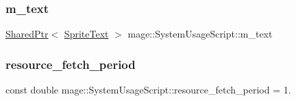 \subsubsection{\texorpdfstring{m\+\_\+text}{m\_text}}
{\footnotesize\ttfamily \hyperlink{namespacemage_a1e01ae66713838a7a67d30e44c67703e}{Shared\+Ptr}$<$ \hyperlink{classmage_1_1_sprite_text}{Sprite\+Text} $>$ mage\+::\+System\+Usage\+Script\+::m\+\_\+text\hspace{0.3cm}{\ttfamily [private]}}

\hypertarget{classmage_1_1_system_usage_script_a98a30b1da6b9b87237e3509aed961162}{}\label{classmage_1_1_system_usage_script_a98a30b1da6b9b87237e3509aed961162} 
\subsubsection{\texorpdfstring{resource\+\_\+fetch\+\_\+period}{resource\_fetch\_period}}
{\footnotesize\ttfamily const double mage\+::\+System\+Usage\+Script\+::resource\+\_\+fetch\+\_\+period = 1.\hspace{0.3cm}{\ttfamily [static]}}

